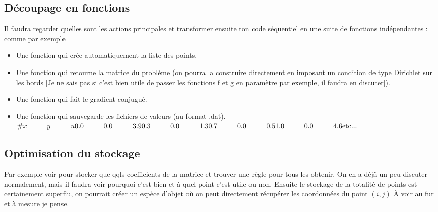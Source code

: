 \documentclass[french]{article}
\begin{document}
\subsection{Découpage en fonctions}
Il faudra regarder quelles sont les actions principales et transformer ensuite ton code séquentiel en une suite de fonctions indépendantes : comme par exemple
\begin{itemize}
\item Une fonction qui crée automatiquement la liste des points.
\item Une fonction qui retourne la matrice du problème (on pourra la construire directement en imposant un condition de type Dirichlet sur les bords [Je ne sais pas si c'est bien utile de passer les fonctions f et g en paramètre par exemple, il faudra en discuter]).
\item Une fonction qui fait le gradient conjugué.
\item Une fonction qui sauvegarde les fichiers de valeurs (au format .dat). 
\begin{math}
\# x \hspace{1cm} y \hspace{1cm} u\newline
0.0 \hspace{1cm} 0.0 \hspace{1cm} 3.9\newline
0.3 \hspace{1cm} 0.0 \hspace{1cm} 1.3\newline
0.7 \hspace{1cm} 0.0 \hspace{1cm} 0.5\newline
1.0 \hspace{1cm} 0.0 \hspace{1cm} 4.6\newline
\mbox{etc...}
\end{math}
\end{itemize}

\subsection{Optimisation du stockage}
Par exemple voir pour stocker que qqls coefficients de la matrice et trouver une règle pour tous les obtenir. On en a déjà un peu discuter normalement, mais il faudra voir pourquoi c'est bien et à quel point c'est utile ou non.\newline
Ensuite le stockage de la totalité de points est certainement superflu, on pourrait créer un espèce d'objet où on peut directement récupérer les coordonnées du point $\left(i, j\right)$ À voir au fur et à mesure je pense.
\end{document}
